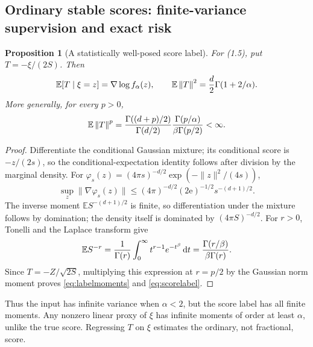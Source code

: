 \documentclass[11pt]{article}
\newtheorem{proposition}[theorem]{Proposition}
\theoremstyle{definition}\newtheorem{definition}[theorem]{Definition}
\theoremstyle{remark}\newtheorem{remark}[theorem]{Remark}
\numberwithin{equation}{section}
\newcommand{\norm}[1]{\left\lVert#1\right\rVert}\newcommand{\TV}{\mathrm{TV}}
\newcommand{\dd}{\,\mathrm d}\newcommand{\cA}{c_\alpha}\newcommand{\sg}{\operatorname{sigmoid}}
\newcommand{\1}{\mathbf 1}
\begin{document}
\subsection{Ordinary stable scores: finite-variance supervision and exact risk}
\begin{proposition}[A statistically well-posed score label]\label{prop:label}
For (1.5), put $T=-\xi/(2S)$. Then
\begin{equation}
\E[T\mid\xi=z]=\nabla\log f_\alpha(z),\qquad
\E\norm T^2=\frac d2\Gamma(1+2/\alpha).\label{eq:scorelabel}
\end{equation}
More generally, for every $p>0$,
\begin{equation}
\E\norm T^p=
\frac{\Gamma((d+p)/2)}{\Gamma(d/2)}
\frac{\Gamma(p/\alpha)}{\beta\Gamma(p/2)}<\infty.\label{eq:labelmoments}
\end{equation}
\end{proposition}
\begin{proof}
Differentiate the conditional Gaussian mixture; its conditional score is $-z/(2s)$, so the conditional-expectation identity follows after division by the marginal density. For $\varphi_s(z)=(4\pi s)^{-d/2}\exp(-\|z\|^2/(4s))$,
\[
 \sup_z\|\nabla\varphi_s(z)\|
 \le (4\pi)^{-d/2}(2\mathrm e)^{-1/2}s^{-(d+1)/2}.
\]
The inverse moment $\mathbb E S^{-(d+1)/2}$ is finite, so differentiation under the mixture follows by domination; the density itself is dominated by $(4\pi S)^{-d/2}$. For $r>0$, Tonelli and the Laplace transform give
\[
\E S^{-r}=\frac1{\Gamma(r)}\int_0^\infty t^{r-1}e^{-t^\beta}\dd t
=\frac{\Gamma(r/\beta)}{\beta\Gamma(r)}.
\]
Since $T=-Z/\sqrt{2S}$, multiplying this expression at $r=p/2$ by the Gaussian norm moment proves \eqref{eq:labelmoments} and \eqref{eq:scorelabel}.
\end{proof}
Thus the input has infinite variance when $\alpha<2$, but the score label has all finite moments. Any nonzero linear proxy of $\xi$ has infinite moments of order at least $\alpha$, unlike the true score. Regressing $T$ on $\xi$ estimates the ordinary, not fractional, score.
\end{document}
